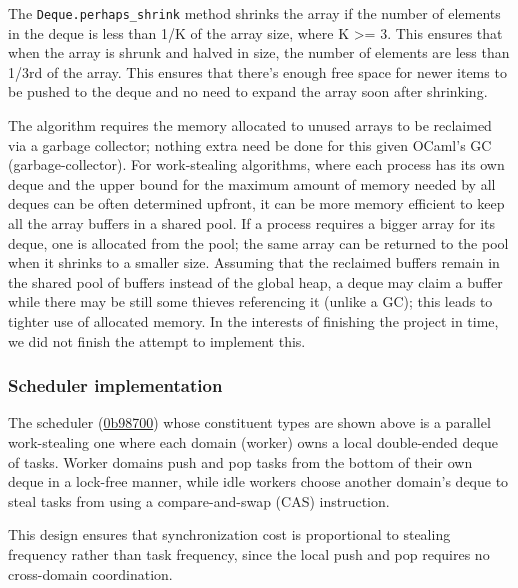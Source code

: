 \documentclass[11pt,a4paper]{article}
\begin{document}
The \texttt{Deque.perhaps\_shrink} method shrinks the
array if the number of elements in the deque is less than 1/K of the array size,
where K >= 3. This ensures that when the array is shrunk and halved in size, the
number of elements are less than 1/3rd of the array. This ensures that there's
enough free space for newer items to be pushed to the deque and no need to
expand the array soon after shrinking.

The \cite{chase2005dynamic} algorithm requires the memory allocated to unused arrays to be
reclaimed via a garbage collector; nothing extra need be done for this given
OCaml's GC (garbage-collector). For work-stealing algorithms, where each process
has its own deque and the upper bound for the maximum amount of memory needed by all
deques can be often determined upfront, it can be more memory efficient to keep
all the array buffers in a shared pool. If a process requires a bigger array for
its deque, one is allocated from the pool; the same array can be returned to the
pool when it shrinks to a smaller size. Assuming that the
reclaimed buffers remain in the shared pool of buffers instead of the global
heap, a deque may claim a buffer while there may be still some thieves
referencing it (unlike a GC); this leads to tighter use of allocated memory.
In the interests of finishing the project in time, we did not finish the attempt
to implement this.

\subsubsection{Scheduler implementation}

The scheduler (\href{https://github.com/alinab/fork-cs6868_s26/blame/work-steal/work-steal/lib/scheduler.ml}{0b98700})
whose constituent types are shown above is a parallel work-stealing
one where each domain (worker) owns a local double-ended deque of tasks. Worker domains
push and pop tasks from the bottom of their own deque in a lock-free manner,
while idle workers choose another domain's deque to steal tasks from using a
compare-and-swap (CAS) instruction.

This design ensures that synchronization cost is proportional to stealing
frequency rather than task frequency, since the local push and pop requires no
cross-domain coordination.
\end{document}
